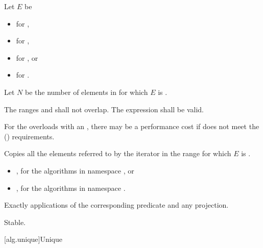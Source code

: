 \begin{itemdescr}
\pnum
Let $E$ be
\begin{itemize}
\item {} for ,
\item {} for ,
\item {} for , or
\item {} for .
\end{itemize}

\pnum
Let $N$ be the number of elements in  for which $E$ is .

\pnum
\requires
The ranges
and
shall not overlap. The expression  shall be valid.
\begin{note}
For the overloads with an , there may be a performance
cost if  does not meet the
 () requirements.
\end{note}

\pnum
\effects
Copies all the elements referred to by the iterator
in the range
for which $E$ is .

\pnum
\returns
\begin{itemize}
\item {}, for the algorithms in namespace , or
\item {}, for the algorithms in namespace .
\end{itemize}

\pnum
\complexity
Exactly
applications of the corresponding predicate and any projection.

\pnum
\remarks Stable.
\end{itemdescr}

[alg.unique]{Unique}

